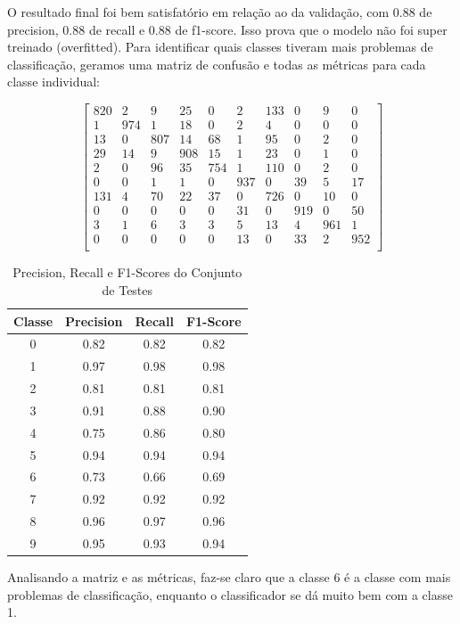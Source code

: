 \documentclass[conference]{IEEEtran}
\begin{document}
	O resultado final foi bem satisfatório em relação ao da validação, com $0.88$ de precision, $0.88$ de recall e $0.88$ de f1-score. Isso prova que o modelo não foi super treinado (overfitted). Para identificar quais classes tiveram mais problemas de classificação, geramos uma matriz de confusão e todas as métricas para cada classe individual:
	
	
	
\[
\begin{bmatrix}
    820 & 2   & 9   & 25  & 0   & 2   & 133 & 0   & 9   & 0 \\
    1   & 974 & 1   & 18  & 0   & 2   & 4   & 0   & 0   & 0 \\
    13  & 0   & 807 & 14  & 68  & 1   & 95  & 0   & 2   & 0 \\
    29  & 14  & 9   & 908 & 15  & 1   & 23  & 0   & 1   & 0 \\
    2   & 0   & 96  & 35  & 754 & 1   & 110 & 0   & 2   & 0 \\
    0   & 0   & 1   & 1   & 0   & 937 &  0  & 39  & 5   & 17 \\
    131 & 4   & 70  & 22  & 37  & 0   & 726 & 0   & 10  & 0 \\
    0   & 0   & 0   & 0   & 0   & 31  & 0   & 919 & 0   & 50 \\
    3   & 1   & 6   & 3   & 3   & 5   & 13  & 4   & 961 & 1  \\
    0   & 0   & 0   & 0   & 0   & 13  & 0   & 33  & 2   & 952 \\
\end{bmatrix}
\]



\begin{table}[h!]
 \begin{center}
  \caption{Precision, Recall e F1-Scores do Conjunto de Testes}
  \label{table:table3}
  \begin{tabular}{ |c|c|c|c| }
   \hline
   Classe & Precision & Recall & F1-Score\\
   \hline
   0 & 0.82 & 0.82 & 0.82 \\
   1 & 0.97 & 0.98 & 0.98 \\
   2 & 0.81 & 0.81 & 0.81 \\
   3 & 0.91 & 0.88 & 0.90 \\
   4 & 0.75 & 0.86 & 0.80 \\
   5 & 0.94 & 0.94 & 0.94 \\
   6 & 0.73 & 0.66 & 0.69 \\
   7 & 0.92 & 0.92 & 0.92 \\
   8 & 0.96 & 0.97 & 0.96 \\
   9 & 0.95 & 0.93 & 0.94 \\
   \hline
 \end{tabular}
 \end{center}
\end{table}
	
	Analisando a matriz e as métricas, faz-se claro que a classe 6 é a classe com mais problemas de classificação, enquanto o classificador se dá muito bem com a classe 1.

\printbibliography
\end{document}
